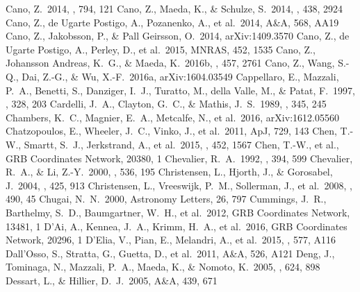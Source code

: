 \documentclass[traditabstract,longauth]{aa}
\begin{document}
\begin{thebibliography}{99}
 Cano, Z.\ 2014, \apj, 794, 121 
 Cano, Z., Maeda, K., \& Schulze, S.\ 2014, \mnras, 438, 2924 
 Cano, Z., de Ugarte Postigo, A., Pozanenko, A., et al.\ 2014, A\&A, 568, AA19 
 Cano, Z., Jakobsson, P., \& Pall Geirsson, O.\ 2014, arXiv:1409.3570 
 Cano, Z., de Ugarte Postigo, A., Perley, D., et al.\ 2015, MNRAS, 452, 1535 
 Cano, Z., Johansson Andreas, K.~G., \& Maeda, K.\ 2016b, \mnras, 457, 2761 
 Cano, Z., Wang, S.-Q., Dai, Z.-G., \& Wu, X.-F.\ 2016a, arXiv:1604.03549 
  Cappellaro, E., Mazzali, P.~A., Benetti, S., Danziger, I.~J., Turatto, M., della Valle, M., \& Patat, F.\ 1997, \aap, 328, 203 
  Cardelli, J.~A., Clayton, G.~C., \& Mathis, J.~S.\ 1989, \apj, 345, 245 
 Chambers, K.~C., Magnier, E.~A., Metcalfe, N., et al.\ 2016, arXiv:1612.05560 
 Chatzopoulos, E., Wheeler, J.~C., Vinko, J., et al.\ 2011, ApJ, 729, 143 
 Chen, T.-W., Smartt, S.~J., Jerkstrand, A., et al.\ 2015, \mnras, 452, 1567 
 Chen, T.-W., et al., GRB Coordinates Network, 20380, 1 
  Chevalier, R.~A.\ 1992, \apj, 394, 599 
  Chevalier, R.~A., \& Li, Z.-Y.\ 2000, \apj, 536, 195 
 Christensen, L., Hjorth, J., \& Gorosabel, J.\ 2004, \aap, 425, 913 
 Christensen, L., Vreeswijk, P.~M., Sollerman, J., et al.\ 2008, \aap, 490, 45 
  Chugai, N.~N.\ 2000, Astronomy Letters, 26, 797 
  Cummings, J.~R., Barthelmy, S.~D., Baumgartner, W.~H., et al.\ 2012, GRB Coordinates Network, 13481, 1 
 D'Ai, A., Kennea, J.~A., Krimm, H.~A., et al.\ 2016, GRB Coordinates Network, 20296, 1 
 D'Elia, V., Pian, E., Melandri, A., et al.\ 2015, \aap, 577, A116 
 Dall'Osso, S., Stratta, G., Guetta, D., et al.\ 2011, A\&A, 526, A121 
  Deng, J., Tominaga, N., Mazzali, P.~A., Maeda, K., \& Nomoto, K.\ 2005, \apj, 624, 898 
 Dessart, L., \& Hillier, D.~J.\ 2005, A\&A, 439, 671 

\end{thebibliography}
\end{document}
